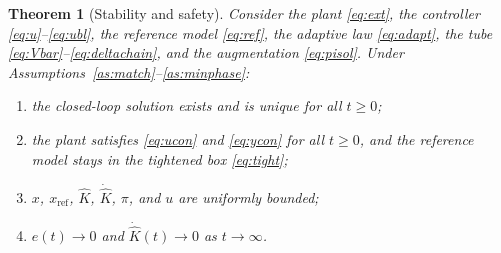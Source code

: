 \documentclass[lettersize,journal]{IEEEtran}
\newtheorem{theorem}{Theorem}
\newcommand{\Kh}{\hat{K}}
\newcommand{\Khd}{\dot{\hat{K}}}
\newcommand{\xr}{x_{\mathrm{ref}}}
\begin{document}
\begin{theorem}[Stability and safety] \label{th:main}
Consider the plant \eqref{eq:ext}, the controller \eqref{eq:u}--\eqref{eq:ubl}, the reference model \eqref{eq:ref}, the adaptive law \eqref{eq:adapt}, the tube \eqref{eq:Vbar}--\eqref{eq:deltachain}, and the augmentation \eqref{eq:pisol}. Under Assumptions~\ref{as:match}--\ref{as:minphase}:
\begin{enumerate}
\item the closed-loop solution exists and is unique for all $t\ge0$;
\item the plant satisfies \eqref{eq:ucon} and \eqref{eq:ycon} for all $t\ge0$, and the reference model stays in the tightened box \eqref{eq:tight};
\item $x$, $\xr$, $\Kh$, $\Khd$, $\pi$, and $u$ are uniformly bounded;
\item $e(t)\to0$ and $\Khd(t)\to0$ as $t\to\infty$.
\end{enumerate}
\end{theorem}
\end{document}
